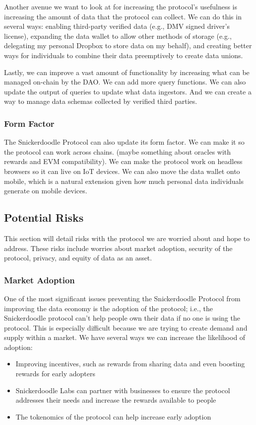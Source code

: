 Another avenue we want to look at for increasing the protocol's usefulness is increasing the amount of data that the protocol can collect. We can do this in several ways: enabling third-party verified data (e.g., DMV signed driver's license), expanding the data wallet to allow other methods of storage (e.g., delegating my personal Dropbox to store data on my behalf), and creating better ways for individuals to combine their data preemptively to create data unions. 

Lastly, we can improve a vast amount of functionality by increasing what can be managed on-chain by the DAO. We can add more query functions. We can also update the output of queries to update what data ingestors. And we can create a way to manage data schemas collected by verified third parties. 

\subsubsection{Form Factor}
\label{section:FormFactor}
The Snickerdoodle Protocol can also update its form factor. We can make it so the protocol can work across chains. (maybe something about oracles with rewards and EVM compatibility). We can make the protocol work on headless browsers so it can live on IoT devices. We can also move the data wallet onto mobile, which is a natural extension given how much personal data individuals generate on mobile devices.

\subsection{Potential Risks}
This section will detail risks with the protocol we are worried about and hope to address. These risks include worries about market adoption, security of the protocol, privacy, and equity of data as an asset.

\subsubsection{Market Adoption}
One of the most significant issues preventing the Snickerdoodle Protocol from improving the data economy is the adoption of the protocol; i.e., the Snickerdoodle protocol can't help people own their data if no one is using the protocol. This is especially difficult because we are trying to create demand and supply within a market. We have several ways we can increase the likelihood of adoption:
\begin{itemize}
  \item Improving incentives, such as rewards from sharing data and even boosting rewards for early adopters
  \item Snickerdoodle Labs can partner with businesses to ensure the protocol addresses their needs and increase the rewards available to people
  \item The tokenomics of the protocol can help increase early adoption
\end{itemize}
